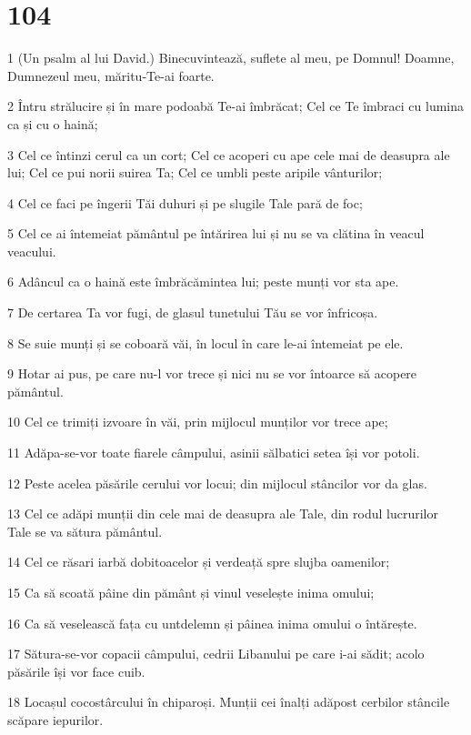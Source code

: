 \chapter{104}

\par 1 (Un psalm al lui David.) Binecuvintează, suflete al meu, pe Domnul! Doamne, Dumnezeul meu, măritu-Te-ai foarte.
\par 2 Întru strălucire și în mare podoabă Te-ai îmbrăcat; Cel ce Te îmbraci cu lumina ca și cu o haină;
\par 3 Cel ce întinzi cerul ca un cort; Cel ce acoperi cu ape cele mai de deasupra ale lui; Cel ce pui norii suirea Ta; Cel ce umbli peste aripile vânturilor;
\par 4 Cel ce faci pe îngerii Tăi duhuri și pe slugile Tale pară de foc;
\par 5 Cel ce ai întemeiat pământul pe întărirea lui și nu se va clătina în veacul veacului.
\par 6 Adâncul ca o haină este îmbrăcămintea lui; peste munți vor sta ape.
\par 7 De certarea Ta vor fugi, de glasul tunetului Tău se vor înfricoșa.
\par 8 Se suie munți și se coboară văi, în locul în care le-ai întemeiat pe ele.
\par 9 Hotar ai pus, pe care nu-l vor trece și nici nu se vor întoarce să acopere pământul.
\par 10 Cel ce trimiți izvoare în văi, prin mijlocul munților vor trece ape;
\par 11 Adăpa-se-vor toate fiarele câmpului, asinii sălbatici setea își vor potoli.
\par 12 Peste acelea păsările cerului vor locui; din mijlocul stâncilor vor da glas.
\par 13 Cel ce adăpi munții din cele mai de deasupra ale Tale, din rodul lucrurilor Tale se va sătura pământul.
\par 14 Cel ce răsari iarbă dobitoacelor și verdeață spre slujba oamenilor;
\par 15 Ca să scoată pâine din pământ și vinul veselește inima omului;
\par 16 Ca să veselească fața cu untdelemn și pâinea inima omului o întărește.
\par 17 Sătura-se-vor copacii câmpului, cedrii Libanului pe care i-ai sădit; acolo păsările își vor face cuib.
\par 18 Locașul cocostârcului în chiparoși. Munții cei înalți adăpost cerbilor stâncile scăpare iepurilor.
